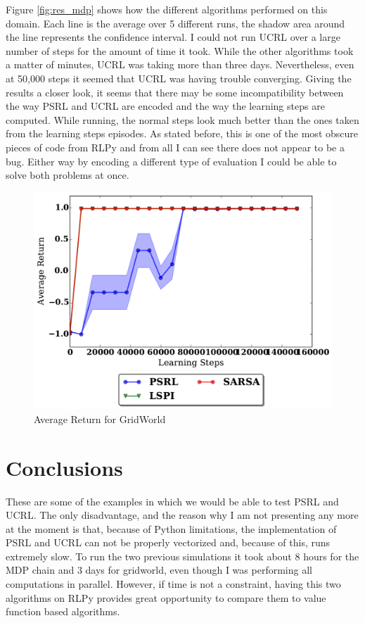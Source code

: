 \documentclass[12pt]{article}
\begin{document}
 Figure \ref{fig:res_mdp} shows how the different algorithms performed on this domain. Each line is the average over 5 different runs, the shadow area around the line represents the confidence interval. I could not run UCRL over a large number of steps for the amount of time it took. While the other algorithms took a matter of minutes, UCRL was taking more than three days. Nevertheless, even at 50,000 steps it seemed that UCRL was having trouble converging. Giving the results a closer look, it seems that there may be some incompatibility between the way PSRL and UCRL are encoded and the way the learning steps are computed. While running, the normal steps look much better than the ones taken from the learning steps episodes. As stated before, this is one of the most obscure pieces of code from RLPy and from all I can see there does not appear to be a bug. Either way by encoding a different type of evaluation I could be able to solve both problems at once.




\begin{figure}[h]
\centering
\includegraphics[scale=.4]{Grid.pdf}
\caption{Average Return for GridWorld}
\label{fig:res_grid}
\end{figure}


\section{Conclusions}
\label{sec:conc}
These are some of the examples in which we would be able to test PSRL and UCRL. The only disadvantage, and the reason why I am not presenting any more at the moment is that, because of Python limitations, the implementation of PSRL and UCRL can not be properly vectorized and, because of this, runs extremely slow. To run the two previous simulations it took about 8 hours for the MDP chain and 3 days for gridworld, even though I was performing all computations in parallel. However, if time is not a constraint, having this two algorithms on RLPy provides great opportunity to compare them to value function based algorithms.
\end{document}

